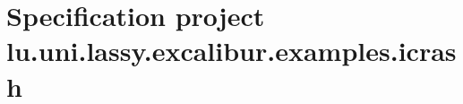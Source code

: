 \chapter{Specification project lu.uni.lassy.excalibur.examples.icrash}

\label{chap:lu.uni.lassy.excalibur.examples.icrash-lu.uni.lassy.excalibur.examples.icrash}








